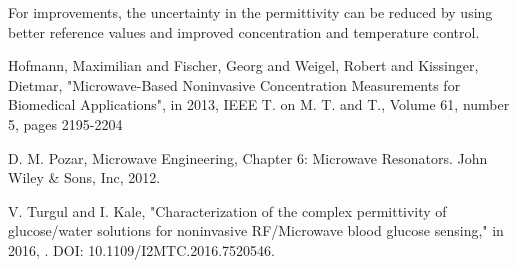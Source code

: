 \documentclass[10pt,final,conference,a4paper,twocolumn]{IEEEtran_AntennEMB_GigaHertz2016}
\begin{document}
For improvements, the uncertainty in the permittivity can be reduced by using better reference values and improved concentration and temperature control.







%
%


\begin{thebibliography}{99}
	
	
	
	 Hofmann, Maximilian and Fischer, Georg and Weigel, Robert and Kissinger, Dietmar, "Microwave-Based Noninvasive Concentration Measurements for Biomedical Applications", in 2013, IEEE T. on M. T. and T., Volume 61, number 5, pages 2195-2204
	
	 D. M. Pozar, Microwave Engineering, Chapter 6: Microwave Resonators. John Wiley \& Sons,
	Inc, 2012.
	
	 V. Turgul and I. Kale, "Characterization of the complex permittivity of glucose/water solutions for noninvasive RF/Microwave blood glucose sensing," in 2016, . DOI: 10.1109/I2MTC.2016.7520546.
\end{thebibliography}


\end{document}
